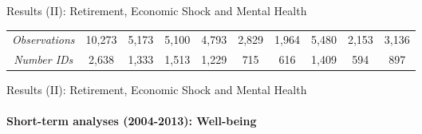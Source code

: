 \documentclass{beamer}
\begin{document}
\begin{frame}{Results (II): Retirement, Economic Shock and Mental Health}
\begin{table}[h]
{\begin{tabular}{@{}lccccccccc@{}}
\multicolumn{1}{c}{\textit{Observations}} & 10,273 & 5,173 & 5,100 & 4,793 & 2,829 & 1,964 & 5,480 & 2,153 & 3,136 \\
\multicolumn{1}{c}{\textit{Number IDs}} & 2,638 & 1,333 & 1,513 & 1,229 & 715 & 616 & 1,409 & 594 & 897 \\ \bottomrule
\end{tabular}%
}
\end{table}
\end{frame}


\begin{frame}{Results (II): Retirement, Economic Shock and Mental Health}
    \framesubtitle{Short-term analyses (2004-2013): Well-being}

\begin{table}[h]
\centering
\label{tab31}
\end{table}
\end{frame}
\end{document}
